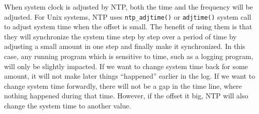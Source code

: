 When system clock is adjusted by NTP\null, both the time and the frequency
will be adjusted. For Unix systems, NTP uses \verb|ntp_adjtime()| or
\verb|adjtime()| system call to adjust system time when the offset is small.
The benefit of using them is that they will synchronize the system time step by
step over a period of time by adjusting a small amount in one step and finally
make it synchronized. In this case, any running program which is sensitive to
time, such as a logging program, will only be slightly impacted. If we want to
change system time back for some amount, it will not make later things
``happened'' earlier in the log. If we want to change system time forwardly,
there will not be a gap in the time line, where nothing happened during that
time. However, if the offset it big, NTP will also change the system time to
another value.





